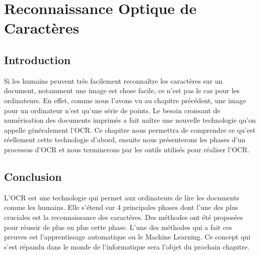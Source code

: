 \chapter{\textbf{Reconnaissance Optique de Caractères}}
    \section{Introduction}
    Si les humains peuvent très facilement reconnaître les caractères sur un document, notamment une image est chose facile, ce n’est pas le cas pour les ordinateurs. En effet, comme nous l’avons vu au chapitre précédent, une image pour un ordinateur n’est qu’une série de points. Le besoin croissant de numérisation des documents imprimés a fait naître une nouvelle technologie qu’on appelle généralement l'OCR. Ce chapitre nous permettra de comprendre ce qu'est réellement cette technologie d’abord, ensuite nous présenterons les phases d’un processus d’OCR et nous terminerons par les outils utilisés pour réaliser l’OCR.
    
    
    
    

    \section{Conclusion}
    L’OCR est une technologie qui permet aux ordinateurs de lire les documents comme les humains. Elle s’étend sur 4 principales phases dont l’une des plus cruciales est la reconnaissance des caractères. Des méthodes ont été proposées pour réussir de plus en plus cette phase. L’une des méthodes qui a fait ces preuves est l’apprentissage automatique ou le Machine Learning. Ce concept qui s’est répandu dans le monde de l’informatique sera l’objet du prochain chapitre.